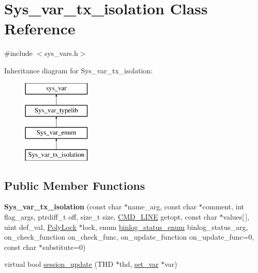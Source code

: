 \hypertarget{classSys__var__tx__isolation}{}\section{Sys\+\_\+var\+\_\+tx\+\_\+isolation Class Reference}
\label{classSys__var__tx__isolation}


{\ttfamily \#include $<$sys\+\_\+vars.\+h$>$}

Inheritance diagram for Sys\+\_\+var\+\_\+tx\+\_\+isolation\+:\begin{figure}[H]
\begin{center}
\leavevmode
\includegraphics[height=4.000000cm]{classSys__var__tx__isolation}
\end{center}
\end{figure}
\subsection*{Public Member Functions}
\begin{DoxyCompactItemize}
\item 
\mbox{\label{classSys__var__tx__isolation_aaec3510d2a0c1938825c87ded51627b5}} 
{\bfseries Sys\+\_\+var\+\_\+tx\+\_\+isolation} (const char $\ast$name\+\_\+arg, const char $\ast$comment, int flag\+\_\+args, ptrdiff\+\_\+t off, size\+\_\+t size, \mbox{\hyperlink{structCMD__LINE}{C\+M\+D\+\_\+\+L\+I\+NE}} getopt, const char $\ast$values\mbox{[}$\,$\mbox{]}, uint def\+\_\+val, \mbox{\hyperlink{classPolyLock}{Poly\+Lock}} $\ast$lock, enum \mbox{\hyperlink{classsys__var_a664520ec82191888717c86085bfa83ce}{binlog\+\_\+status\+\_\+enum}} binlog\+\_\+status\+\_\+arg, on\+\_\+check\+\_\+function on\+\_\+check\+\_\+func, on\+\_\+update\+\_\+function on\+\_\+update\+\_\+func=0, const char $\ast$substitute=0)
\item 
virtual bool \mbox{\hyperlink{classSys__var__tx__isolation_a7c95e5b9a2dd36a02a9ff05d6ada8d42}{session\+\_\+update}} (T\+HD $\ast$thd, \mbox{\hyperlink{classset__var}{set\+\_\+var}} $\ast$var)
\end{DoxyCompactItemize}
